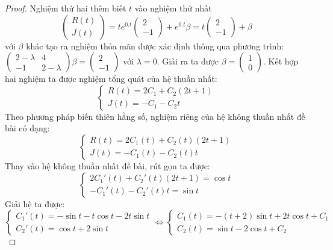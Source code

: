 \documentclass[a4paper]{article}
\begin{document}
\begin{proof}
Nghiệm thứ hai thêm biết $t$ vào nghiệm thứ nhất 
$$
\begin{pmatrix}
    R(t) \\
    J(t)
\end{pmatrix} = te^{0.t} \begin{pmatrix}
    2 \\
    -1
\end{pmatrix} + e^{0.t} \beta  
= t\begin{pmatrix}
    2 \\
    -1
\end{pmatrix} + \beta 
$$
với $\beta$ khác tạo ra nghiệm thỏa mãn được xác định thông qua phương trình:
$\begin{pmatrix}
    2 - \lambda & 4\\
    -1 & 2 -\lambda
\end{pmatrix} \beta = \begin{pmatrix}
    2 \\
    -1
\end{pmatrix}$ với $\lambda = 0$. Giải ra ta được $\beta = \begin{pmatrix}
    1 \\
    0
\end{pmatrix}$. Kết hợp hai nghiệm ta được nghiệm tổng quát của hệ thuần nhất: 
$$
\begin{cases}
    R(t) = 2C_1 + C_2(2t+1) \\
    J(t) = -C_1 - C_2 t
\end{cases}$$
Theo phương pháp biến thiên hằng số, nghiệm riêng của hệ không thuần nhất đề bài có dạng: 
$$
\begin{cases}
    R(t) = 2C_1(t) + C_2(t)(2t+1)\\
    J(t) = -C_1(t) - C_2(t)t
\end{cases}$$
Thay vào hệ không thuần nhất đề bài, rút gọn ta được: 
$$
\begin{cases}
    2C_1'(t) + C_2'(t)(2t+1) = \cos{t} \\
    -C_1'(t) - C_2'(t)t = \sin{t}
\end{cases}$$
Giải hệ ta được: 
$$
\begin{cases}
    C_1'(t) = -\sin{t} - t\cos{t} - 2t\sin{t} \\
    C_2'(t) = \cos{t} + 2\sin{t}
\end{cases} \Leftrightarrow \begin{cases}
    C_1(t) = -(t+2)\sin{t} + 2t\cos{t} + C_1 \\
    C_2(t) = \sin{t} - 2\cos{t} + C_2
\end{cases}
$$
\end{proof}
\end{document}

